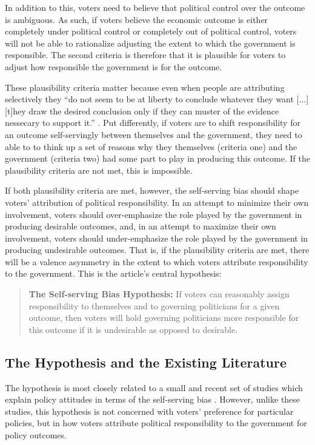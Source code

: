 \documentclass[a4paper,11pt]{article}
\begin{document}
	In addition to this, voters need to believe that political control over the outcome is ambiguous. As such, if voters believe the economic outcome is either completely under political control or completely out of political control, voters will not be able to rationalize adjusting the extent to which the government is responsible. The second criteria is therefore that it is plausible for voters to adjust how responsible the government is for the outcome.
	
	These plausibility criteria matter because even when people are attributing selectively they ``do not seem to be at liberty to conclude whatever they want [...] [t]hey draw the desired conclusion only if they can muster of the evidence nessecary to support it.'' \cite[482-283]{kunda1990case}. Put differently, if voters are to shift responsibility for an outcome self-servingly between themselves and the government, they need to able to to think up a set of reasons why they themselves (criteria one) and the government (criteria two) had some part to play in producing this outcome. If the plausibility criteria are not met, this is impossible.
	
	If both plausibility criteria are met, however, the self-serving bias should shape voters' attribution of political responsibility. In an attempt to minimize their own involvement,  voters should over-emphasize the role played by the government in producing desirable outcomes, and, in an attempt to maximize their own involvement, voters should under-emphasize the role played by the government in producing undesirable outcomes. That is, if the plausibility criteria are met, there will be a valence asymmetry in the extent to which voters attribute responsibility to the government. This is the article's central hypothesis:
	
	\begin{quote}
		\textbf{The Self-serving Bias Hypothesis:} If voters can reasonably assign responsibility to themselves and to governing politicians for a given outcome, then voters will hold governing politicians more responsible for this outcome if it is undesirable as opposed to desirable.
	\end{quote}
	
	
	
	\subsection{The Hypothesis and the Existing Literature}
	
	The hypothesis is most closely related to a small and recent set of studies which explain policy attitudes in terms of the self-serving bias \citep[e.g.,][]{deffains2016political,cassar2017matter,joslyn2017gun}. However, unlike these studies, this hypothesis is not concerned with voters' preference for particular policies, but in how voters attribute political responsibility to the government for policy outcomes. 
	
\end{document}
